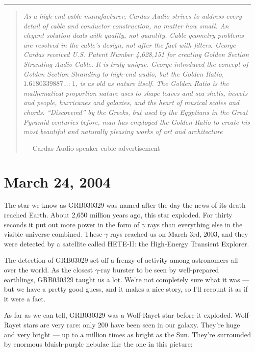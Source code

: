 \documentclass{article}
\begin{document}
\begin{center}\rule{0.5\linewidth}{0.5pt}\end{center}

\begin{quote}
\emph{As a high-end cable manufacturer, Cardas Audio strives to address
every detail of cable and conductor construction, no matter how small.
An elegant solution deals with quality, not quantity. Cable geometry
problems are resolved in the cable's design, not after the fact with
filters. George Cardas received U.S. Patent Number 4,628,151 for
creating Golden Section Stranding Audio Cable. It is truly unique.
George introduced the concept of Golden Section Stranding to high-end
audio, but the Golden Ratio, \(1.6180339887... : 1\), is as old as
nature itself. The Golden Ratio is the mathematical proportion nature
uses to shape leaves and sea shells, insects and people, hurricanes and
galaxies, and the heart of musical scales and chords. ``Discovered'' by
the Greeks, but used by the Egyptians in the Great Pyramid centuries
before, man has employed the Golden Ratio to create his most beautiful
and naturally pleasing works of art and architecture}

--- Cardas Audio speaker cable advertisement
\end{quote}



\hypertarget{week204}{%
\section{March 24, 2004}\label{week204}}

The star we know as GRB030329 was named after the day the news of its
death reached Earth. About 2,650 million years ago, this star exploded.
For thirty seconds it put out more power in the form of \(\gamma\) rays
than everything else in the visible universe combined. These \(\gamma\)
rays reached us on March 3rd, 2003, and they were detected by a
satellite called HETE-II: the High-Energy Transient Explorer.

The detection of GRB03029 set off a frenzy of activity among astronomers
all over the world. As the closest \(\gamma\)-ray burster to be seen by
well-prepared earthlings, GRB030329 taught us a lot. We're not
completely sure what it was --- but we have a pretty good guess, and it
makes a nice story, so I'll recount it as if it were a fact.

As far as we can tell, GRB030329 was a Wolf-Rayet star before it
exploded. Wolf-Rayet stars are very rare: only 200 have been seen in our
galaxy. They're huge and very bright --- up to a million times as bright
as the Sun. They're surrounded by enormous bluish-purple nebulae like
the one in this picture:
\end{document}
